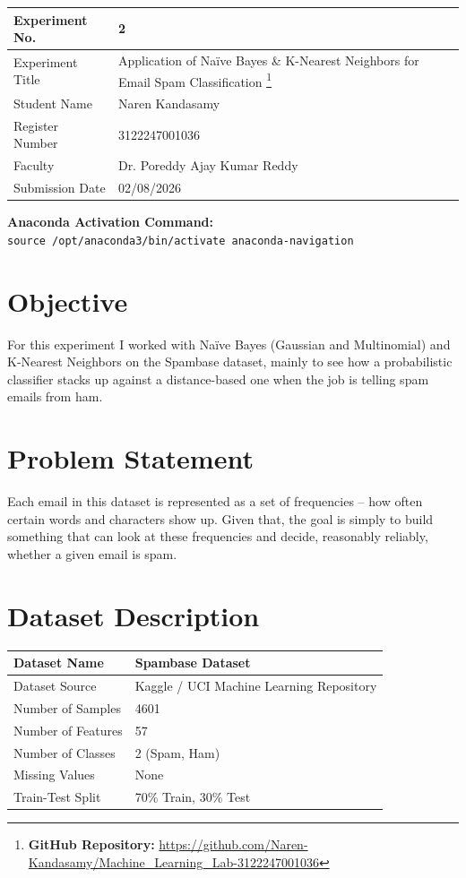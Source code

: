 \documentclass[12pt,a4paper]{article}
\begin{document}
\begin{tabular}{|p{4cm}|p{11cm}|}
\hline
Experiment No. & 2 \\ \hline
Experiment Title & Application of Naïve Bayes \& K-Nearest Neighbors for Email Spam Classification
\footnote{\textbf{GitHub Repository: }\url{https://github.com/Naren-Kandasamy/Machine_Learning_Lab-3122247001036}}\\ \hline
Student Name & Naren Kandasamy \\ \hline
Register Number & 3122247001036 \\ \hline
Faculty & Dr. Poreddy Ajay Kumar Reddy \\ \hline
Submission Date & 02/08/2026 \\ \hline
\end{tabular}

\vspace{0.5cm}
\noindent\textbf{Anaconda Activation Command:} \\
\texttt{source /opt/anaconda3/bin/activate anaconda-navigation}

\section{Objective}
For this experiment I worked with Naïve Bayes (Gaussian and Multinomial) and K-Nearest Neighbors on the Spambase dataset, mainly to see how a probabilistic classifier stacks up against a distance-based one when the job is telling spam emails from ham.

\section{Problem Statement}
Each email in this dataset is represented as a set of frequencies -- how often certain words and characters show up. Given that, the goal is simply to build something that can look at these frequencies and decide, reasonably reliably, whether a given email is spam.

\section{Dataset Description}
\begin{longtable}{|p{6cm}|p{8cm}|}
\hline
Dataset Name & Spambase Dataset \\ \hline
Dataset Source & Kaggle / UCI Machine Learning Repository \\ \hline
Number of Samples & 4601 \\ \hline
Number of Features & 57 \\ \hline
Number of Classes & 2 (Spam, Ham) \\ \hline
Missing Values & None \\ \hline
Train-Test Split & 70\% Train, 30\% Test \\ \hline
\end{longtable}
\end{document}
